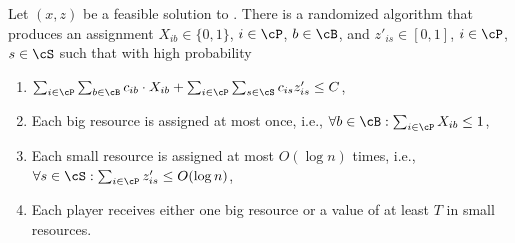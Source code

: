 \documentclass[a4paper,USenglish,cleveref,thm-restate]{lipics-v2021}
\begin{document}
\begin{lemma}
    \label{lem:cost-preservation}
    Let $(x,z)$ be a feasible solution to . There is a randomized algorithm that produces an assignment $X_{ib}\in\{0,1\}$, $i\in \cP$, $b\in\cB$, and $z'_{is}\in [0,1]$, $i\in \cP$, $s\in\cS$ such that
    with high probability
    \begin{enumerate}
        \item $\sum_{i\in\cP}\sum_{b\in\cB} c_{ib}\cdot X_{ib} +  \sum_{i\in\cP }\sum_{s\in\cS} c_{is} z'_{is} \leq C$, \label{eq:costs}
        \item Each big resource is assigned at most once, i.e., $\forall b\in \cB :\sum_{i\in\cP} X_{ib} \le 1$,
        \item Each small resource is assigned at most $O(\log n)$ times, i.e., $\forall s\in \cS: \sum_{i\in\cP} z'_{is} \le O(\log n)$,
        \item Each player receives either one big resource or a value of at least $T$ in small resources.
    \end{enumerate}
\end{lemma}
\end{document}
